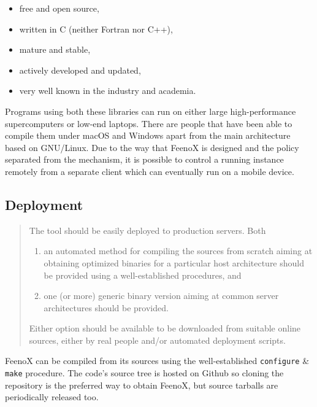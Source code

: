 \documentclass[
  american,
]{article}
\providecommand{\tightlist}{%
  \setlength{\itemsep}{0pt}\setlength{\parskip}{0pt}}
\begin{document}
\begin{itemize}
\tightlist
\item
  free and open source,
\item
  written in C (neither Fortran nor C++),
\item
  mature and stable,
\item
  actively developed and updated,
\item
  very well known in the industry and academia.
\end{itemize}

Programs using both these libraries can run on either large
high-performance supercomputers or low-end laptops. There are people
that have been able to compile them under macOS and Windows apart from
the main architecture based on GNU/Linux. Due to the way that FeenoX is
designed and the policy separated from the mechanism, it is possible to
control a running instance remotely from a separate client which can
eventually run on a mobile device.

\hypertarget{sec:deployment}{%
\subsection{Deployment}\label{sec:deployment}}

\begin{quote}
The tool should be easily deployed to production servers. Both

\begin{enumerate}
\def\labelenumi{\alph{enumi}.}
\tightlist
\item
  an automated method for compiling the sources from scratch aiming at
  obtaining optimized binaries for a particular host architecture should
  be provided using a well-established procedures, and
\item
  one (or more) generic binary version aiming at common server
  architectures should be provided.
\end{enumerate}

Either option should be available to be downloaded from suitable online
sources, either by real people and/or automated deployment scripts.
\end{quote}

FeenoX can be compiled from its sources using the well-established
\passthrough{\lstinline!configure!} \& \passthrough{\lstinline!make!}
procedure. The code's source tree is hosted on Github so cloning the
repository is the preferred way to obtain FeenoX, but source tarballs
are periodically released too.
\end{document}
